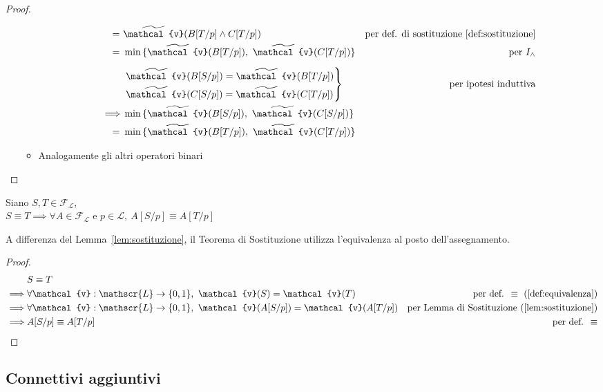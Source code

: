 \begin{proof}
\begin{itemize}
\begin{itemize}
\begin{align*}
            =\ & \widetilde{\mathcal{v}}(B[T/p] \land C[T/p]) & \text{per def. di sostituzione \ref{def:sostituzione}} \\
            =\ & \min{\{\widetilde{\mathcal{v}}(B[T/p]),\ \widetilde{\mathcal{v}}(C[T/p])\}} & \text{per } I_\land \\[5pt]
            & \begin{rcases*}
              \widetilde{\mathcal{v}}(B[S/p]) = \widetilde{\mathcal{v}}(B[T/p]) \\
              \widetilde{\mathcal{v}}(C[S/p]) = \widetilde{\mathcal{v}}(C[T/p])
            \end{rcases*}
            & \text{ per ipotesi induttiva} \\
            \implies & \min{\{\widetilde{\mathcal{v}}(B[S/p]),\ \widetilde{\mathcal{v}}(C[S/p])\}} \\
            =\ & \min{\{\widetilde{\mathcal{v}}(B[T/p]),\ \widetilde{\mathcal{v}}(C[T/p])\}}
          \end{align*}
         \item Analogamente gli altri operatori binari
      \end{itemize} 
  \end{itemize}
\end{proof}
\begin{teo}[di Sostituzione]
Siano $S, T \in \mathscr{F_L}$, \\
$S \equiv T \implies \forall A \in \mathscr{F_L}$ e $p \in \mathscr{L},\ A[S/p] \equiv A[T/p]$ 
\end{teo}
A differenza del Lemma~\ref{lem:sostituzione}, il Teorema di Sostituzione utilizza l'equivalenza al posto dell'assegnamento.
\begin{proof}
  \begin{align*}
    & S \equiv T \\
    \implies & \forall \mathcal{v}: \mathscr{L} \rightarrow \{0,1\},\ \mathcal{v}(S) = \mathcal{v}(T) & \text{per def. }\equiv~(\ref{def:equivalenza}) \\
    \implies & \forall \mathcal{v}: \mathscr{L} \rightarrow \{0,1\},\ \mathcal{v}(A[S/p]) = \mathcal{v}(A[T/p]) & \text{per Lemma di Sostituzione}~(\ref{lem:sostituzione}) \\
    \implies & A[S/p] \equiv A[T/p] & \text{per def. }\equiv
  \end{align*}
\end{proof}

\subsection{Connettivi aggiuntivi}
\label{connettivi-aggiuntivi}
